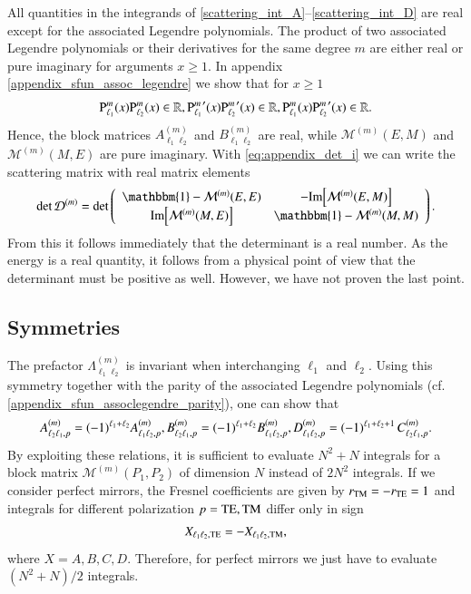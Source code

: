 All quantities in the integrands of
\eqref{scattering_int_A}--\eqref{scattering_int_D} are real except for the
associated Legendre polynomials. The product of two associated Legendre
polynomials or their derivatives for the same degree $m$ are either real or
pure imaginary for arguments $x \ge 1$. In appendix
\ref{appendix_sfun_assoc_legendre} we show that for $x\ge1$
\begin{equation}
{\text{P}_{\ell_1}^{m}}(x) {\text{P}_{\ell_2}^{m}}(x) \in \mathbb{R}, \\
{\text{P}_{\ell_1}^{m}}^\prime(x) {\text{P}_{\ell_2}^{m}}^\prime(x) \in \mathbb{R}, \\
{\text{P}_{\ell_1}^{m}}(x) {\text{P}_{\ell_2}^{m}}^\prime(x) \in \mathbb{R}.
\end{equation}
Hence, the block matrices $A^{(m)}_{\ell_1\ell_2}$ and $B^{(m)}_{\ell_1\ell_2}$ are
real, while $\mathcal{M}^{(m)}(E,M)$ and $\mathcal{M}^{(m)}(M,E)$
are pure imaginary.
With \eqref{eq:appendix_det_i} we can write the scattering matrix with real matrix elements
\begin{equation}
\det \mathcal{D}^{(m)} = \det \left(\begin{array}{cc}
\mathbbm{1}-\mathcal{M}^{(m)}(E,E) & -\Im{\left[\mathcal{M}^{(m)}(E,M)\right]} \\
\Im{\left[\mathcal{M}^{(m)}(M,E)\right]} & \mathbbm{1}-\mathcal{M}^{(m)}(M,M)
\end{array}\right).
\end{equation}
From this it follows immediately that the determinant is a real number. As the
energy is a real quantity, it follows from a physical point of view that the
determinant must be positive as well. However, we have not proven the last
point.


\subsection{Symmetries}

The prefactor $\Lambda_{\ell_1 \ell_2}^{(m)}$ is invariant when
interchanging $\ell_1$ and $\ell_2$.
Using this symmetry together with the parity of the
associated Legendre polynomials (cf. \eqref{appendix_sfun_assoclegendre_parity}), one can show that
\begin{equation}
A_{\ell_2 \ell_1,p}^{(m)} = (-1)^{\ell_1+\ell_2} A_{\ell_1 \ell_2,p}^{(m)}, \\
B_{\ell_2 \ell_1,p}^{(m)} = (-1)^{\ell_1+\ell_2} B_{\ell_1 \ell_2,p}^{(m)}, \\
D_{\ell_1 \ell_2,p}^{(m)} = (-1)^{\ell_1+\ell_2+1} \, C_{\ell_2 \ell_1,p}^{(m)}.
\end{equation}
By exploiting these relations, it is sufficient to evaluate
$N^2+N$ integrals for a block matrix $\mathcal{M}^{(m)}(P_1,P_2)$ of dimension $N$
instead of $2N^2$ integrals. If we consider perfect mirrors, the Fresnel coefficients
are given by $r_{\mathrm{TM}}=-r_{\mathrm{TE}}=1$ and integrals for different polarization $p=\mathrm{TE},\mathrm{TM}$
differ only in sign
\begin{equation}
X_{\ell_1 \ell_2,\mathrm{TE}} = -X_{\ell_1 \ell_2,\mathrm{TM}},
\end{equation}
where $X=A,B,C,D$. Therefore, for perfect mirrors we just have to evaluate
$(N^2+N)/2$ integrals.

